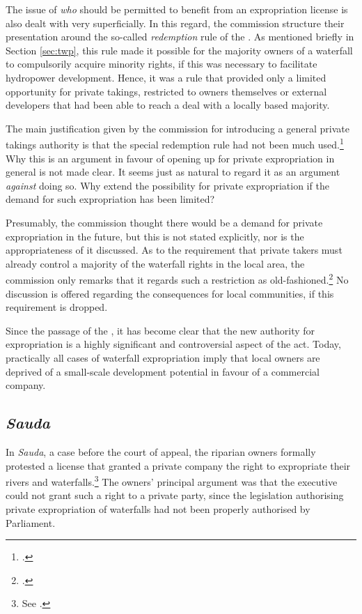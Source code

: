 The issue of {\it who} should be permitted to benefit from an expropriation license is also dealt with very superficially. In this regard, the commission structure their presentation around the so-called {\it redemption} rule of the \cite{wra40}. As mentioned briefly in Section \ref{sec:twp}, this rule made it possible for the majority owners of a waterfall to compulsorily acquire minority rights, if this was necessary to facilitate hydropower development. Hence, it was a rule that provided only a limited opportunity for private takings, restricted to owners themselves or external developers that had been able to reach a deal with a locally based majority.

The main justification given by the commission for introducing a general private takings authority is that the special redemption rule had not been much used.\footcite[236]{nou94} Why this is an argument in favour of opening up for private expropriation in general is not made clear. It seems just as natural to regard it as an argument {\it against} doing so. Why extend the possibility for private expropriation if the demand for such expropriation has been limited?

Presumably, the commission thought there would be a demand for private expropriation in the future, but this is not stated explicitly, nor is the appropriateness of it discussed. As to the requirement that private takers must already control a majority of the waterfall rights in the local area, the commission only remarks that it regards such a restriction as old-fashioned.\footcite[236]{nou94} No discussion is offered regarding the consequences for local communities, if this requirement is dropped.

Since the passage of the \cite{wra00}, it has become clear that the new authority for expropriation is a highly significant and controversial aspect of the act. Today, practically all cases of waterfall expropriation imply that local owners are deprived of a small-scale development potential in favour of a commercial company.

\subsection{\it Sauda}

In {\it Sauda}, a case before the court of appeal, the riparian owners formally protested a license that granted a private company the right to expropriate their rivers and waterfalls.\footnote{See \cite{sauda09}.} The owners' principal argument was that the executive could not grant such a right to a private party, since the legislation authorising private expropriation of waterfalls had not been properly authorised by Parliament. 

